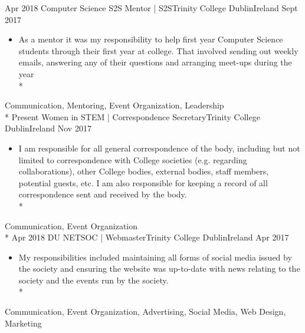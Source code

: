 
\begin{experiences}
  \experience
    {Apr 2018}   {Computer Science S2S Mentor | S2S}{Trinity College Dublin}{Ireland}
    {Sept 2017} {
                      \begin{itemize}
                        \item As a mentor it was my responsibility to help first year Computer Science students through their first year at college. That involved sending out weekly emails, answering any of their questions and arranging meet-ups during the year\\* 
                      \end{itemize}
                    }
                    {Communication, Mentoring, Event Organization, Leadership}\\*
  \emptySeparator
  \experience
    {Present} {Women in STEM | Correspondence Secretary}{Trinity College Dublin}{Ireland}
    {Nov 2017}    {
                      \begin{itemize}
                        \item I am responsible for all general correspondence of the body, including but not limited to correspondence with College societies (e.g. regarding collaborations), other College bodies, external bodies, staff members, potential guests, etc. I am also responsible for keeping a record of all correspondence sent and received by the body. \\*                                       
                      \end{itemize}
                    }
                    {Communication, Event Organization}\\*
  \emptySeparator 
    \experience
    {Apr 2018} {DU NETSOC | Webmaster}{Trinity College Dublin}{Ireland}
    {Apr 2017}    {
                      \begin{itemize}
                        \item My responsibilities included maintaining all forms of social media issued by the society and ensuring the website was up-to-date with news relating to the society and the events run by the society. \\*                                       
                      \end{itemize}
                    }
                    {Communication, Event Organization, Advertising, Social Media, Web Design, Marketing}
  \emptySeparator 
\end{experiences}

